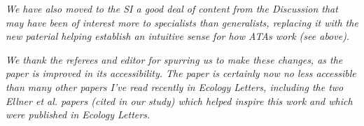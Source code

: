 \documentclass[letterpaper,11pt]{article}
\begin{document}
\emph{We have also moved to the SI a good deal of content from the Discussion that may have been of interest
more to specialists than generalists,
replacing it with the new paterial helping establish an intuitive sense for how ATAs work (see above).}

\emph{We thank the referees and editor for spurring us to make these changes, as the paper is improved in
its accessibility. The paper is certainly now no less accessible than many other papers I've read recently in 
Ecology Letters, including the two Ellner et al. papers (cited in our study) which helped inspire this 
work and which were published in Ecology Letters.} 
\end{document}
